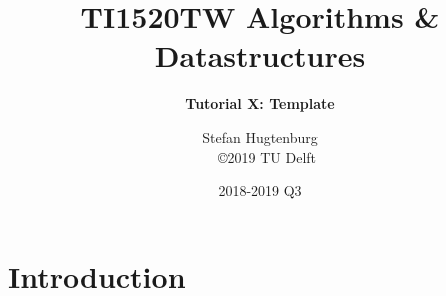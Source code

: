 \documentclass[aspectratio=169]{beamer}
\title[Algorithms \& Datastructures]{TI1520TW Algorithms \& Datastructures}
\subtitle{\color{cyan} \textbf{Tutorial X: Template}}
\author{Stefan Hugtenburg\\ {\tiny{\qquad~~\copyright 2019 TU Delft}}}
\institute{CSE Teaching Team | EEMCS | TU Delft}
\date{2018-2019 Q3}
\begin{document}
\frame{\titlepage}

\section{Introduction}




\frame{\titlepage}
\end{document}
